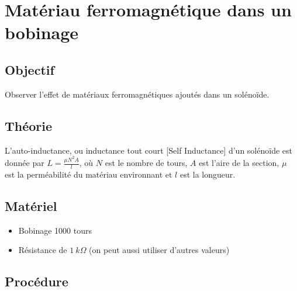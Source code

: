 \documentclass{book}
\begin{document}




\section{Matériau ferromagnétique dans un bobinage}



\subsection{Objectif}


Observer l'effet de matériaux ferromagnétiques ajoutés dans un solénoïde.

\subsection{Théorie}


L'auto-inductance, ou inductance tout court [Self Inductance] d'un solénoïde est donnée par $L=\frac{\mu N^{2}A}{l}$, où $N$ est le nombre de tours, $A$ est l'aire de la section, $\mu$  est la perméabilité du matériau environnant et $l$  est la longueur.

\subsection{Matériel}


\begin{itemize}
  \item Bobinage 1000 tours
  \item Résistance de $1\ k\Omega$  (on peut aussi utiliser d'autres valeurs)
\end{itemize}

\subsection{Procédure}
\end{document}
